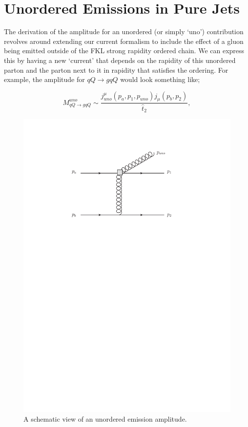\section{Unordered Emissions in Pure Jets}
The derivation of the amplitude for an unordered (or simply `uno') contribution revolves around extending our current formalism to include the effect of a gluon being emitted outside of the FKL strong rapidity ordered chain. We can express this by having a new `current' that depends on the rapidity of this unordered parton and the parton next to it in rapidity that satisfies the ordering. For example, the amplitude for $qQ \to gqQ$ would look something like;

\begin{equation}
M_{qQ \to gqQ}^{uno} \sim \frac{j^\mu_{uno}(p_a,p_1,p_{uno})j_\mu(p_b,p_2)}{\hat{t}_2},
\label{eqn:uno}
\end{equation}

\begin{figure}[t]
\centering
\includegraphics[scale=0.7]{Images/uno.pdf}
\caption{A schematic view of an unordered emission amplitude.}
\label{fig:uno}
\end{figure}

